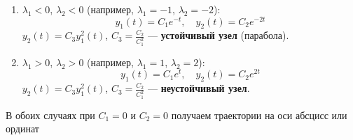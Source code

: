 	\begin{enumerate}
		\item $\lambda_1 < 0$, $\lambda_2 < 0$ (например, $\lambda_1 = -1$, $\lambda_2 = -2$):
		\begin{equation}
			y_1(t) = C_1 e^{-t}, \quad y_2(t) = C_2 e^{-2t}
		\end{equation}
		\vspace{-0.4em}
		$y_2(t) = C_3 y_1^2(t)$, $C_3 = \frac{C_2}{C_1^2}$ — \textbf{устойчивый узел} (парабола).
		\item $\lambda_1 > 0$, $\lambda_2 > 0$ (например, $\lambda_1 = 1$, $\lambda_2 = 2$):
		\begin{equation}
			y_1(t) = C_1 e^{t}, \quad y_2(t) = C_2 e^{2t}
		\end{equation}
		\vspace{-0.4em}
		$y_2(t) = C_3 y_1^2(t)$, $C_3 = \frac{C_2}{C_1^2}$ — \textbf{неустойчивый узел}.
	\end{enumerate}
	В обоих случаях при $C_1 = 0$ и $C_2 = 0$ получаем траектории на оси абсцисс или ординат
	\vspace{-0.5em}
